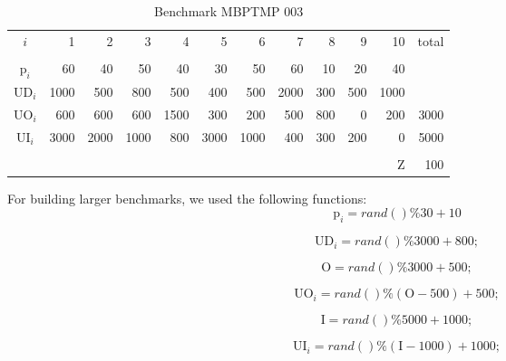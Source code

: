 \documentclass[preprint,12pt,authoryear]{elsarticle}
\begin{document}
\begin{table}[h]
\begin{center}
\begin{small}
\begin{tabular}[c]{c r r r r r r r r r r r }
$i$ & 1 & 2 & 3 & 4 & 5 & 6 & 7 & 8 & 9 & 10 & total \\
\cline {1-12} \\
$\textrm{p}_i$ & 60 & 40 & 50 & 40 & 30 & 50 & 60 & 10 & 20 & 40\\
$\textrm{UD}_i$ & 1000 & 500 & 800 & 500 & 400 & 500 & 2000 & 300 & 500 & 1000 \\
$\textrm{UO}_i$ & 600 & 600 & 600 & 1500 & 300 & 200 & 500 & 800 & 0 & 200 & 3000 \\
$\textrm{UI}_i$ & 3000 & 2000 & 1000 & 800 & 3000 & 1000 & 400 & 300 & 200 & 0 & 5000 \\
\cline {1-12} \\
& & & & & & & & & & $\textrm{Z}$ & 100 \\
\end{tabular}
\label{tab:MBPTMP 001}
\caption{Benchmark MBPTMP 003}
\end{small}
\end{center}
\end{table}

For building larger benchmarks, we used the following functions: \\

\begin{equation}
\textrm{p}_i = rand()\%30 + 10
\end{equation}

\begin{equation}
\textrm{UD}_i = rand()\%3000 + 800;
\end{equation}

\begin{equation}
\textrm{O} = rand()\%3000 + 500;
\end{equation}

\begin{equation}
\textrm{UO}_i = rand()\%(\textrm{O}-500) + 500;
\end{equation}

\begin{equation}
\textrm{I} = rand()\%5000 + 1000;
\end{equation}

\begin{equation}
\textrm{UI}_i = rand()\%(\textrm{I}-1000) + 1000;
\end{equation}
\end{document}
